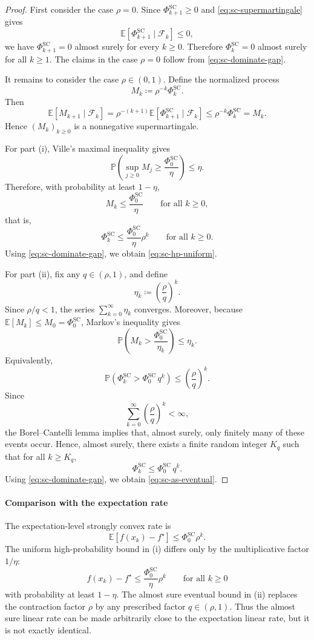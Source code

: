 \documentclass[10pt]{article}
\newcommand{\E}{\mathbb{E}}
\begin{document}
\begin{proof}
First consider the case \(\rho=0\). Since \(\Phi_{k+1}^{\mathrm{SC}}\ge 0\) and
\eqref{eq:sc-supermartingale} gives
\[
\E[\Phi_{k+1}^{\mathrm{SC}}\mid\mathcal F_k]\le 0,
\]
we have \(\Phi_{k+1}^{\mathrm{SC}}=0\) almost surely for every \(k\ge 0\).
Therefore \(\Phi_k^{\mathrm{SC}}=0\) almost surely for all \(k\ge 1\). The claims in
the case \(\rho=0\) follow from \eqref{eq:sc-dominate-gap}.

It remains to consider the case \(\rho\in(0,1)\). Define the normalized process
\[
M_k\coloneqq \rho^{-k}\Phi_k^{\mathrm{SC}}.
\]
Then
\[
\E[M_{k+1}\mid \mathcal F_k]
=
\rho^{-(k+1)}\E[\Phi_{k+1}^{\mathrm{SC}}\mid \mathcal F_k]
\le
\rho^{-k}\Phi_k^{\mathrm{SC}}
=
M_k.
\]
Hence \((M_k)_{k\ge 0}\) is a nonnegative supermartingale.





For part (i), Ville's maximal inequality gives
\[
\mathbb P\!\left(\sup_{j\ge 0}M_j\ge \frac{\Phi_0^{\mathrm{SC}}}{\eta}\right)\le \eta.
\]
Therefore, with probability at least \(1-\eta\),
\[
M_k\le \frac{\Phi_0^{\mathrm{SC}}}{\eta}
\qquad\text{for all }k\ge 0,
\]
that is,
\[
\Phi_k^{\mathrm{SC}}\le \frac{\Phi_0^{\mathrm{SC}}}{\eta}\rho^k
\qquad\text{for all }k\ge 0.
\]
Using \eqref{eq:sc-dominate-gap}, we obtain \eqref{eq:sc-hp-uniform}.

For part (ii), fix any \(q\in(\rho,1)\), and define
\[
\eta_k\coloneqq \left(\frac{\rho}{q}\right)^k.
\]
Since \(\rho/q<1\), the series \(\sum_{k=0}^{\infty}\eta_k\) converges.
Moreover, because \(\E[M_k]\le M_0=\Phi_0^{\mathrm{SC}}\), Markov's inequality gives
\[
\mathbb P\!\left(
M_k>\frac{\Phi_0^{\mathrm{SC}}}{\eta_k}
\right)
\le
\eta_k.
\]
Equivalently,
\[
\mathbb P\!\left(
\Phi_k^{\mathrm{SC}}>\Phi_0^{\mathrm{SC}}\,q^k
\right)
\le
\left(\frac{\rho}{q}\right)^k.
\]
Since
\[
\sum_{k=0}^{\infty}\left(\frac{\rho}{q}\right)^k<\infty,
\]
the Borel--Cantelli lemma implies that, almost surely, only finitely many of these events occur.
Hence, almost surely, there exists a finite random integer \(K_q\) such that for all \(k\ge K_q\),
\[
\Phi_k^{\mathrm{SC}}\le \Phi_0^{\mathrm{SC}}\,q^k.
\]
Using \eqref{eq:sc-dominate-gap}, we obtain \eqref{eq:sc-as-eventual}.
\end{proof}

\paragraph{Comparison with the expectation rate}
The expectation-level strongly convex rate is
\[
\E[f(x_k)-f^\star]\le \Phi_0^{\mathrm{SC}}\rho^k.
\]
The uniform high-probability bound in (i) differs only by the multiplicative factor \(1/\eta\):
\[
f(x_k)-f^\star\le \frac{\Phi_0^{\mathrm{SC}}}{\eta}\rho^k
\qquad\text{for all }k\ge 0
\]
with probability at least \(1-\eta\).
The almost sure eventual bound in (ii) replaces the contraction factor \(\rho\) by any prescribed factor \(q\in(\rho,1)\).
Thus the almost sure linear rate can be made arbitrarily close to the expectation linear rate, but it is not exactly identical.
\end{document}
